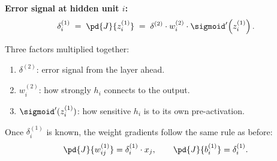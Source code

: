 \documentclass[12pt, a4paper]{article}
\begin{document}
\begin{patternbox}
  \textbf{Error signal at hidden unit $i$:}
  \[
    \delta^{(1)}_i
    \;=\; \pd{J}{z^{(1)}_i}
    \;=\; \delta^{(2)}
    \cdot w^{(2)}_i
    \cdot \sigmoid'\!\left(z^{(1)}_i\right).
  \]

  Three factors multiplied together:
  \begin{enumerate}[nosep]
    \item $\delta^{(2)}$: error signal from the layer ahead.
    \item $w^{(2)}_i$: how strongly $h_i$ connects to the output.
    \item $\sigmoid'(z^{(1)}_i)$: how sensitive $h_i$ is to its own
          pre-activation.
  \end{enumerate}

  Once $\delta^{(1)}_i$ is known, the weight gradients follow the same rule
  as before:
  \[
    \pd{J}{w^{(1)}_{ij}} = \delta^{(1)}_i \cdot x_j, \qquad
    \pd{J}{b^{(1)}_i}    = \delta^{(1)}_i.
  \]
\end{patternbox}

\vspace{0.8em}
\end{document}

